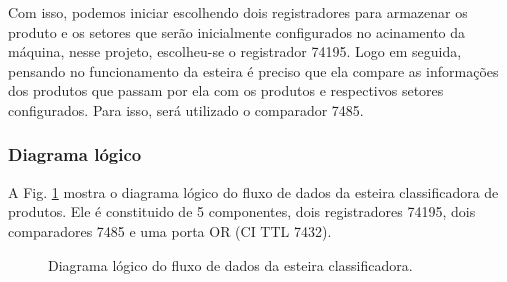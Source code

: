 \documentclass[a4,12pt]{horizon-theme}
\begin{document}
    Com isso, podemos iniciar escolhendo dois registradores para armazenar os produto e os setores que serão inicialmente configurados no acinamento da máquina, nesse projeto, escolheu-se o registrador 74195. Logo em seguida, pensando no funcionamento da esteira é preciso que ela compare as informações dos produtos que passam por ela com os produtos e respectivos setores configurados. Para isso, será utilizado o comparador 7485.

\subsubsection{Diagrama lógico}
\label{sec:plan_diagrama}
    A Fig. \ref{fig:diagrama_logico} mostra o diagrama lógico do fluxo de dados da esteira classificadora de produtos. Ele é constituido de 5 componentes, dois registradores 74195, dois comparadores 7485 e uma porta OR (CI TTL 7432).

\begin{figure}[!ht]
    \centering
    \caption{Diagrama lógico do fluxo de dados da esteira classificadora.}
    \label{fig:diagrama_logico}
\end{figure}
\end{document}
